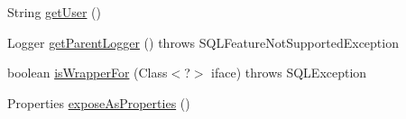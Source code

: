 \begin{DoxyCompactItemize}
\item 
String \mbox{\hyperlink{classcom_1_1mysql_1_1cj_1_1jdbc_1_1_mysql_data_source_a22e84365059e1c1e6e29c9999a31d6b0}{get\+User}} ()
\item 
Logger \mbox{\hyperlink{classcom_1_1mysql_1_1cj_1_1jdbc_1_1_mysql_data_source_a320d8f29b68ec73d1643cf8c8d6b38b7}{get\+Parent\+Logger}} ()  throws S\+Q\+L\+Feature\+Not\+Supported\+Exception 
\item 
boolean \mbox{\hyperlink{classcom_1_1mysql_1_1cj_1_1jdbc_1_1_mysql_data_source_ad0952d8622440b80d28bb8cdb537f97b}{is\+Wrapper\+For}} (Class$<$?$>$ iface)  throws S\+Q\+L\+Exception 
\item 
Properties \mbox{\hyperlink{classcom_1_1mysql_1_1cj_1_1jdbc_1_1_mysql_data_source_aadf54f3a0615c93d0c47fd2baf0b7884}{expose\+As\+Properties}} ()
\end{DoxyCompactItemize}
